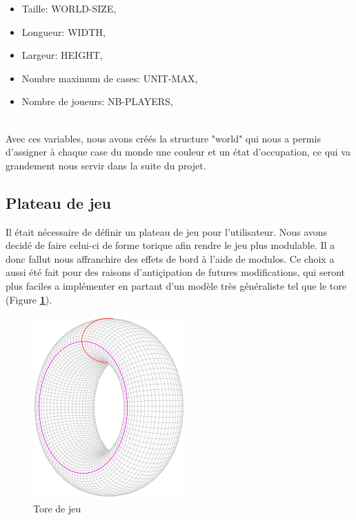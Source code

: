         \begin{itemize}
            \item Taille: WORLD-SIZE,
            \item Longueur: WIDTH,
            \item Largeur: HEIGHT,
            \item Nombre maximum de cases: UNIT-MAX,
            \item Nombre de joueurs: NB-PLAYERS,
        \end{itemize}
        
        \noindent \\ Avec ces variables, nous avons créés la structure "world" qui nous a permis d'assigner à chaque case du monde une couleur et un état d'occupation, ce qui va grandement nous servir dans la suite du projet.
        
    \subsection{Plateau de jeu}\label{part:geometry}
        Il était nécessaire de définir un plateau de jeu pour l'utilisateur. Nous avons decidé de faire celui-ci de forme torique afin rendre le jeu plus modulable. Il a donc fallut nous affranchire des effets de bord à l'aide de modulos. Ce choix a aussi été fait pour des raisons d'antiçipation de futures modifications, qui seront plus faciles a implémenter en partant d'un modèle très généraliste tel que le tore (Figure \textbf{\ref{fig:tore_de_jeu}}).\\
        \newline
            \begin{figure}[H]
                \centering
                \includegraphics[scale=0.4]{tor.png}
                \caption{Tore de jeu}
                \label{fig:tore_de_jeu}
            \end{figure}
  
